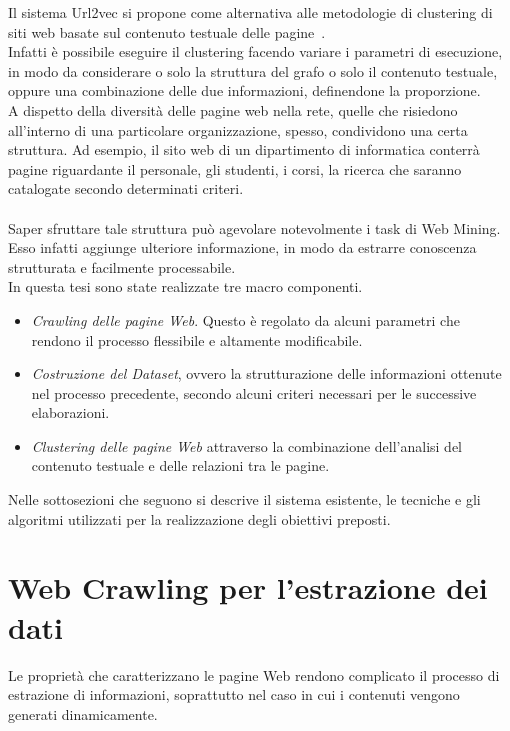 

Il sistema Url2vec si propone come alternativa alle metodologie di clustering di siti web basate sul contenuto testuale delle pagine~\cite{Rajaraman11}. 
\\
Infatti è possibile eseguire il clustering facendo variare i parametri di esecuzione, in modo da considerare o solo la struttura del grafo o solo il contenuto testuale, oppure una combinazione delle due informazioni, definendone la proporzione.
\\
A dispetto della diversità delle pagine web nella rete, quelle che risiedono all'interno di una particolare organizzazione, spesso, condividono una certa struttura.
Ad esempio, il sito web di un dipartimento di informatica conterrà pagine riguardante il personale, gli studenti, i corsi, la ricerca che saranno catalogate secondo determinati criteri. 
\\\\
Saper sfruttare tale struttura può agevolare notevolmente i task di Web Mining. Esso infatti aggiunge ulteriore informazione, in modo da estrarre conoscenza strutturata e facilmente processabile.
\\
In questa tesi sono state realizzate tre macro componenti.
\begin{itemize}
\item \textit{Crawling delle pagine Web}. Questo è regolato da alcuni parametri che rendono il processo flessibile e altamente modificabile.
\item \textit{Costruzione del Dataset}, ovvero la strutturazione delle informazioni ottenute nel processo precedente, secondo alcuni criteri necessari per le successive elaborazioni.
\item \textit{Clustering delle pagine Web} attraverso la combinazione dell'analisi del contenuto testuale e delle relazioni tra le pagine.
\end{itemize}

Nelle sottosezioni che seguono si descrive il sistema esistente, le tecniche e gli algoritmi utilizzati per la realizzazione degli obiettivi preposti.

\section{Web Crawling per l'estrazione dei dati}
\label{crawling}
Le proprietà che caratterizzano le pagine Web rendono complicato il processo di estrazione di informazioni, soprattutto nel caso in cui i contenuti vengono generati dinamicamente.


